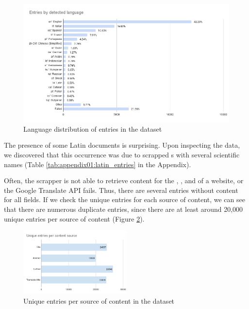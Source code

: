 \begin{figure}
    \centering
    \includegraphics[width=\textwidth]{Figures/04/Entries by detected language.png}
    \caption{Language distribution of entries in the \VSI{} dataset}
    \label{fig:04_vsi_language_distribution}
\end{figure}

The presence of some Latin documents is surprising. Upon inspecting the data, we discovered that this occurrence was due to scrapped \trafilaturaTitle{}s with several scientific names (Table \ref{tab:appendix01:latin_entries} in the Appendix).

Often, the \trafilatura{} scrapper is not able to retrieve content for the \trafilaturaTitle{}, \trafilaturaAbstract{}, and \trafilaturaFulltext{} of a website, or the Google Translate API fails. Thus, there are several entries without content for all fields. If we check the unique entries for each source of content, we can see that there are numerous duplicate entries, since there are at least around 20,000 unique entries per source of content (Figure \ref{fig:04_unique_entries_vsi}).

\begin{figure}
    \centering
    \includegraphics[width=0.50\textwidth]{Figures/04/Unique entries per content source.png}
    \caption{Unique entries per source of content in the \VSI{} dataset}
    \label{fig:04_unique_entries_vsi}
\end{figure}


